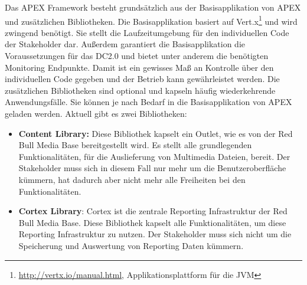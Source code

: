 Das APEX Framework besteht grundsätzlich aus der Basisapplikation von APEX und zusätzlichen Bibliotheken. Die Basisapplikation basiert auf Vert.x\footnote{\url{http://vertx.io/manual.html}, Applikationsplattform für die JVM} und wird zwingend benötigt. Sie stellt die Laufzeitumgebung für den individuellen Code der Stakeholder dar. Außerdem garantiert die Basisapplikation die Voraussetzungen für das DC2.0 und bietet unter anderem die benötigten Monitoring Endpunkte. Damit ist ein gewisses Maß an Kontrolle über den individuellen Code gegeben und der Betrieb kann gewährleistet werden. Die zusätzlichen Bibliotheken sind optional und kapseln häufig wiederkehrende Anwendungsfälle. Sie können je nach Bedarf in die Basisapplikation von APEX geladen werden. Aktuell gibt es zwei Bibliotheken:
\begin{itemize}
	\item \textbf{Content Library:} Diese Bibliothek kapselt ein Outlet, wie es von der Red Bull Media Base bereitgestellt wird. Es stellt alle grundlegenden Funktionalitäten, für die Auslieferung von Multimedia Dateien, bereit. Der Stakeholder muss sich in diesem Fall nur mehr um die Benutzeroberfläche kümmern, hat dadurch aber nicht mehr alle Freiheiten bei den Funktionalitäten.
	\item \textbf{Cortex Library}: Cortex ist die zentrale Reporting Infrastruktur der Red Bull Media Base. Diese Bibliothek kapselt alle Funktionalitäten, um diese Reporting Infrastruktur zu nutzen. Der Stakeholder muss sich nicht um die Speicherung und Auswertung von Reporting Daten kümmern.
\end{itemize}

